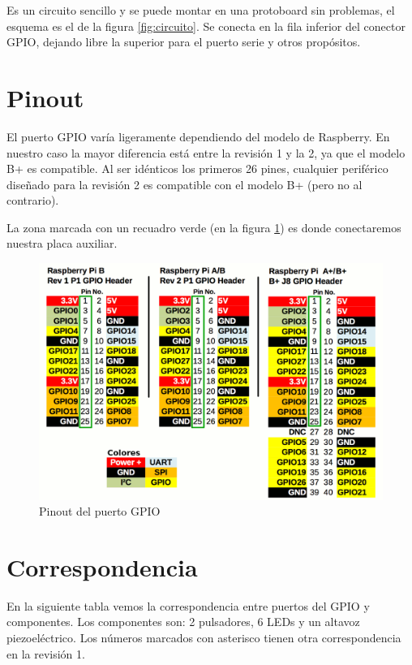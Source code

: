 Es un circuito sencillo y se puede montar en una protoboard sin
problemas, el esquema es el de la figura \ref{fig:circuito}. Se conecta en la fila
inferior del conector GPIO, dejando libre la superior para el puerto
serie y otros propósitos.

\section{Pinout}

El puerto GPIO varía ligeramente dependiendo del modelo de Raspberry. En nuestro caso
la mayor diferencia está entre la revisión 1 y la 2, ya que el modelo B+ es compatible.
Al ser idénticos los primeros 26 pines, cualquier periférico diseñado para la revisión 2
es compatible con el modelo B+ (pero no al contrario).

La zona marcada con un recuadro verde (en la figura \ref{fig:pinout}) es donde
conectaremos nuestra placa auxiliar.

\begin{figure}[h]
  \centering
    \includegraphics[width=14cm]{graphs/RaspberryGPIO.png}
  \caption{Pinout del puerto GPIO}
  \label{fig:pinout}
\end{figure}

\section{Correspondencia}

En la siguiente tabla vemos la correspondencia entre puertos del GPIO y
componentes. Los componentes son: 2 pulsadores, 6 LEDs y un altavoz
piezoeléctrico. Los números marcados con asterisco tienen otra
correspondencia en la revisión 1.

